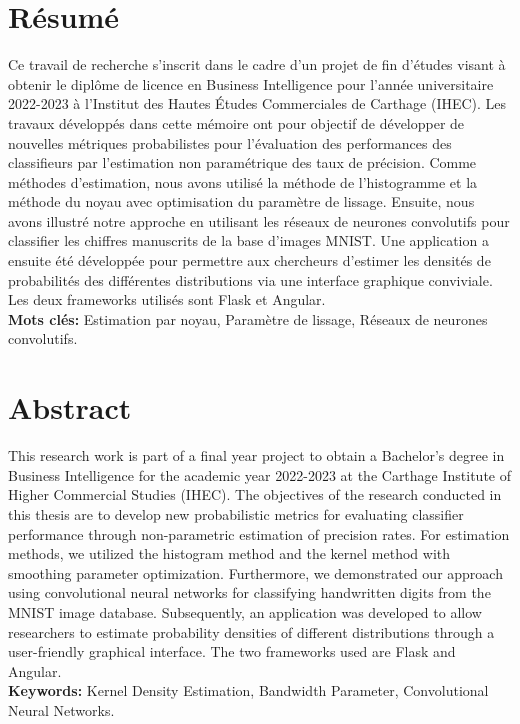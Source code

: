 
\section*{Résumé}
Ce travail de recherche s'inscrit dans le cadre d'un projet de fin d'études visant à obtenir le diplôme de licence en Business Intelligence pour l'année universitaire 2022-2023 à l'Institut des Hautes Études Commerciales de Carthage (IHEC). Les travaux développés dans cette mémoire ont pour objectif de développer de nouvelles métriques probabilistes pour l'évaluation des performances des classifieurs par l'estimation non paramétrique des taux de précision. Comme méthodes d'estimation, nous avons utilisé la méthode de l'histogramme et la méthode du noyau avec optimisation du paramètre de lissage. Ensuite, nous avons illustré notre approche en utilisant les réseaux de neurones convolutifs pour classifier les chiffres manuscrits de la base d'images MNIST. Une application a ensuite été développée pour permettre aux chercheurs d'estimer les densités de probabilités des différentes distributions via une interface graphique conviviale. Les deux frameworks utilisés sont Flask et Angular.\\
\textbf{Mots clés:} 
Estimation par noyau, Paramètre de lissage, Réseaux de neurones convolutifs. 
\vspace{2cm}

\section*{Abstract}
This research work is part of a final year project to obtain a Bachelor's degree in Business Intelligence for the academic year 2022-2023 at the Carthage Institute of Higher Commercial Studies (IHEC). The objectives of the research conducted in this thesis are to develop new probabilistic metrics for evaluating classifier performance through non-parametric estimation of precision rates. For estimation methods, we utilized the histogram method and the kernel method with smoothing parameter optimization. Furthermore, we demonstrated our approach using convolutional neural networks for classifying handwritten digits from the MNIST image database. Subsequently, an application was developed to allow researchers to estimate probability densities of different distributions through a user-friendly graphical interface. The two frameworks used are Flask and Angular.\\
\textbf{Keywords:} 
Kernel Density Estimation, Bandwidth Parameter, Convolutional Neural Networks.







